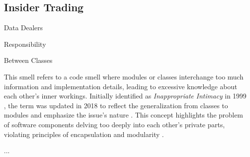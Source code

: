 \subsection{Insider Trading} 

\begin{description}[align=left, labelwidth=2.4cm]
  \item [Obstruction] Data Dealers
  \item [Occurence] Responsibility
  \item [Expanse] Between Classes 
\end{description}


This smell refers to a code smell where modules or classes interchange too much information and implementation details, leading to excessive knowledge about each other's inner workings. Initially identified as \textit{Inappropriate Intimacy} in 1999 \cite{Martin_1999}, the term was updated in 2018 to reflect the generalization from classes to modules and emphasize the issue's nature \cite{Martin_2018}. This concept highlights the problem of software components delving too deeply into each other's private parts, violating principles of encapsulation and modularity \cite{Jerzyk_2023}.

...





